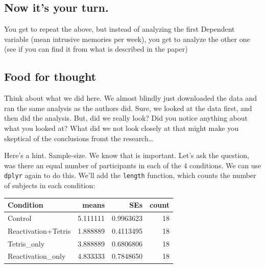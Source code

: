\documentclass[]{book}
\newenvironment{Shaded}{\begin{snugshade}}{\end{snugshade}}
\newcommand{\KeywordTok}[1]{\textcolor[rgb]{0.13,0.29,0.53}{\textbf{{#1}}}}
\newcommand{\DataTypeTok}[1]{\textcolor[rgb]{0.13,0.29,0.53}{{#1}}}
\newcommand{\StringTok}[1]{\textcolor[rgb]{0.31,0.60,0.02}{{#1}}}
\newcommand{\NormalTok}[1]{{#1}}
\theoremstyle{definition}
\theoremstyle{definition}
\theoremstyle{definition}
\theoremstyle{remark}
\begin{document}
\subsection{Now it's your turn.}\label{now-its-your-turn.}

You get to repeat the above, but instead of analyzing the first
Dependent variable (mean intrusive memories per week), you get to
analyze the other one (see if you can find it from what is described in
the paper)

\subsection{Food for thought}\label{food-for-thought}

Think about what we did here. We almost blindly just downloaded the data
and ran the same analysis as the authors did. Sure, we looked at the
data first, and then did the analysis. But, did we really look? Did you
notice anything about what you looked at? What did we not look closely
at that might make you skeptical of the conclusions fromt the
research\ldots{}

Here's a hint. Sample-size. We know that is important. Let's ask the
question, was there an equal number of participants in each of the 4
conditions. We can use \texttt{dplyr} again to do this. We'll add the
\texttt{length} function, which counts the number of subjects in each
condition:

\begin{Shaded}
\end{Shaded}

\begin{tabular}{l|r|r|r}
\hline
Condition & means & SEs & count\\
\hline
Control & 5.111111 & 0.9963623 & 18\\
\hline
Reactivation+Tetris & 1.888889 & 0.4113495 & 18\\
\hline
Tetris\_only & 3.888889 & 0.6806806 & 18\\
\hline
Reactivation\_only & 4.833333 & 0.7848650 & 18\\
\hline
\end{tabular}
\end{document}
